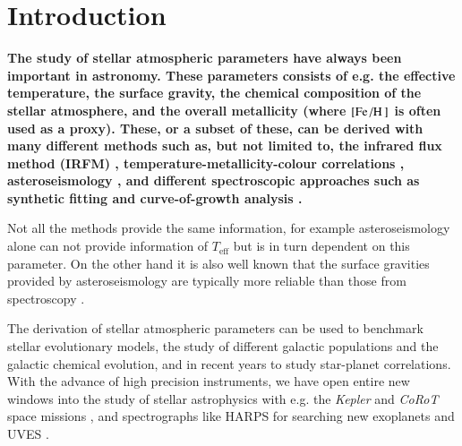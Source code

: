 \documentclass{aa}
\begin{document}
\maketitle



\section{Introduction}
\label{sec:introduction}

{\bf
The study of stellar atmospheric parameters have always been important in astronomy. These
parameters consists of e.g. the effective temperature, the surface gravity, the chemical composition
of the stellar atmosphere, and the overall metallicity (where $[\ion{Fe}/\ion{H}]$ is often used as
a proxy). These, or a subset of these, can be derived with many different methods such as, but not
limited to, the infrared flux method (IRFM) \citep{Blackwell1977}, temperature-metallicity-colour
correlations \citep[see e.g.][]{Ramirez2005b}, asteroseismology \citep[see][for a classic
example]{Kjeldsen1995}, and different spectroscopic approaches such as synthetic fitting \citep[see
e.g.][]{Onehag2012,Tsantaki2017} and curve-of-growth analysis \citep[see
e.g.][]{Sousa2008a,Andreasen2017a}.

Not all the methods provide the same information, for example asteroseismology alone can not provide
information of $T_\mathrm{eff}$ but is in turn dependent on this parameter. On the other hand it is
also well known that the surface gravities provided by asteroseismology are typically more reliable
than those from spectroscopy \citep[see e.g. the discussion by][]{Mortier2014}.

The derivation of stellar atmospheric parameters can be used to benchmark stellar evolutionary
models, the study of different galactic populations and the galactic chemical evolution, and in
recent years to study star-planet correlations. With the advance of high precision instruments, we
have open entire new windows into the study of stellar astrophysics with e.g. the \emph{Kepler} and
\emph{CoRoT} space missions \citep[see e.g.][]{ChristensenDalsgaard2010,Chaplin2011,Huber2014}, and
spectrographs like HARPS for searching new exoplanets \citep{HARPS} and UVES \citep{UVES}.

}
\end{document}
